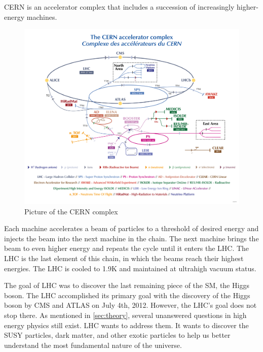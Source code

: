 CERN is an accelerator complex that includes a succession of increasingly higher-energy machines.
\begin{figure}[h!]
	\caption{Picture of the CERN complex \cite{CERN}}
  \label{fig:CERN}
  \centering
  \includegraphics[width=1.0\linewidth]{figs/LHC.png}
\end{figure}
Each machine accelerates a beam of particles to a threshold of desired energy and injects the beam into the next machine in the chain.
The next machine brings the beam to even higher energy and repeats the cycle until it enters the LHC.
The LHC is the last element of this chain, in which the beams reach their highest energies.
The LHC is cooled to 1.9K and maintained at ultrahigh vacuum status.

The goal of LHC was to discover the last remaining piece of the SM, the Higgs boson.
The LHC accomplished its primary goal with the discovery of the Higgs boson by CMS and ATLAS on July 4th, 2012.
However, the LHC's goal does not stop there.
As mentioned in \ref{sec:theory}, several unanswered questions in high energy physics still exist.
LHC wants to address them. It wants to discover the SUSY particles, dark matter, and other exotic particles to help us better understand the most fundamental nature of the universe.


